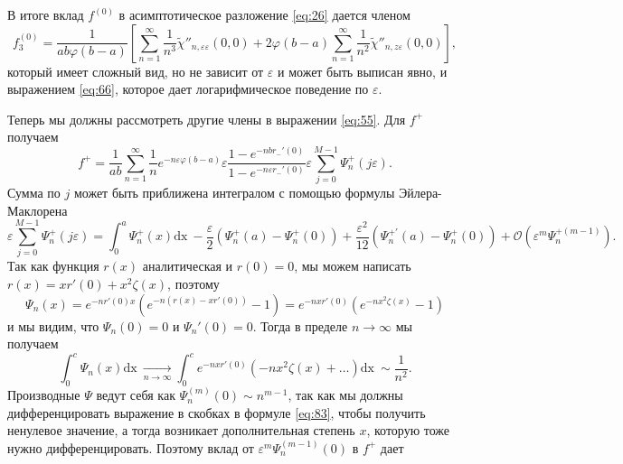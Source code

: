 \documentclass{article}
\newcommand{\dx}{\mathrm{dx}~}
\begin{document}
В итоге вклад $f^{(0)}$ в асимптотическое разложение \eqref{eq:26} дается членом
\begin{equation}
  \label{eq:87}
f^{(0)}_{3}=\frac{1}{ab\varphi(b-a)}\left[\sum_{n=1}^{\infty} \frac{1}{n^{3}}
  \tilde{\chi}''_{n,\varepsilon\varepsilon}(0,0)+2\varphi(b-a)\sum_{n=1}^{\infty}\frac{1}{n^{2}}\tilde{\chi}''_{n,z\varepsilon}(0,0)\right],
\end{equation}
который имеет сложный вид, но не зависит от  $\varepsilon$ и может быть выписан явно, и выражением
\eqref{eq:66}, которое дает логарифмическое поведение по $\varepsilon$.

Теперь мы должны рассмотреть другие члены в выражении \eqref{eq:55}. Для $f^{+}$ получаем
\begin{equation}
  \label{eq:67}
  f^{+}=\frac{1}{ab}\sum_{n=1}^{\infty}\frac{1}{n} e^{-n\varepsilon\varphi(b-a)} \varepsilon
  \frac{1-e^{-nbr_{-}'(0)}}{1-e^{-n\varepsilon r_{-}'(0)}}\varepsilon\sum_{j=0}^{M-1}\Psi^{+}_{n}(j\varepsilon).
\end{equation}
Сумма по $j$ может быть приближена интегралом с помощью формулы Эйлера-Маклорена
\begin{equation}
  \label{eq:68}
  \varepsilon\sum_{j=0}^{M-1}\Psi^{+}_{n}(j\varepsilon) = \int_{0}^{a}\Psi^{+}_{n}(x) \dx -
  \frac{\varepsilon}{2}\left(\Psi^{+}_{n}(a)-\Psi^{+}_{n}(0)\right)+
  \frac{\varepsilon^{2}}{12}\left(\Psi^{+'}_{n}(a)-\Psi^{+}_{n}(0)\right)+
  \mathcal{O}\left(\varepsilon^{m}\Psi^{+(m-1)}_{n}\right).
\end{equation}
Так как функция $r(x)$ аналитическая и  $r(0)=0$, мы можем написать $r(x)=xr'(0)+x^{2}\zeta(x)$, поэтому
\begin{equation}
  \label{eq:83}
\Psi_{n}(x)=e^{-nr'(0)x}\left(e^{-n\left(r(x)-xr'(0)\right)}-1\right)=e^{-nxr'(0)}\left(e^{-nx^{2}\zeta(x)}-1\right)  
\end{equation}
и мы видим, что $\Psi_{n}(0)=0$ и $\Psi_{n}'(0)=0$.
Тогда в пределе $n\to\infty$ мы получаем
\begin{equation}
  \label{eq:69}
  \int_{0}^{c}\Psi_{n}(x)
  \dx \xrightarrow[n\to\infty]{}\int_{0}^{c}e^{-nxr'(0)}\left(-nx^{2}\zeta(x)+\dots\right)\dx\sim \frac{1}{n^{2}}.
\end{equation}
Производные  $\Psi$ ведут себя как  $\Psi_{n}^{(m)}(0)\sim n^{m-1}$, так как мы должны
дифференцировать выражение в скобках в формуле \eqref{eq:83}, чтобы получить ненулевое значение, а
тогда возникает дополнительная степень  $x$, которую тоже нужно дифференцировать. Поэтому вклад от
$\varepsilon^{m}\Psi_{n}^{(m-1)}(0)$ в $f^{+}$ дает
\end{document}

